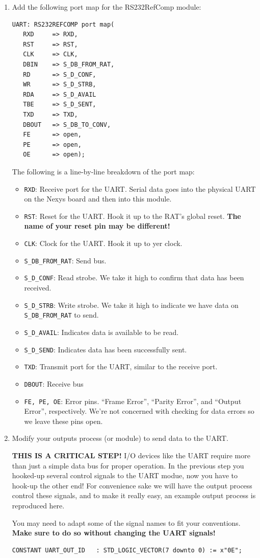 \documentclass[notitlepage]{article}
\newcommand{\warningsign}{\fontencoding{U}\fontfamily{futs}\Large\selectfont\char 66\relax}
\begin{document}
\begin {enumerate}
\item Add the following port map for the RS232RefComp module:
\begin{verbatim}
UART: RS232REFCOMP port map(
   RXD     => RXD,
   RST     => RST,
   CLK     => CLK,
   DBIN    => S_DB_FROM_RAT,
   RD      => S_D_CONF,
   WR      => S_D_STRB,
   RDA     => S_D_AVAIL
   TBE     => S_D_SENT,
   TXD     => TXD,
   DBOUT   => S_DB_TO_CONV,
   FE      => open,
   PE      => open,
   OE      => open);
\end{verbatim}
The following is a line-by-line breakdown of the port map:
\begin{itemize}
\item \texttt{RXD}: Receive port for the UART. Serial data goes into the physical UART on the Nexys board and then into this module.
\item \texttt{RST}: Reset for the UART. Hook it up to the RAT's global reset. \textbf{The name of your reset pin may be different!}
\item \texttt{CLK}: Clock for the UART. Hook it up to yer clock. 
\item \texttt{S\_DB\_FROM\_RAT}: Send bus.
\item \texttt{S\_D\_CONF}: Read strobe. We take it high to confirm that data has been received.
\item \texttt{S\_D\_STRB}: Write strobe. We take it high to indicate we have data on \texttt{S\_DB\_FROM\_RAT} to send.
\item \texttt{S\_D\_AVAIL}: Indicates data is available to be read.
\item \texttt{S\_D\_SEND}: Indicates data has been successfully sent.
\item \texttt{TXD}: Transmit port for the UART, similar to the receive port.
\item \texttt{DBOUT}: Receive bus
\item \texttt{FE, PE, OE}: Error pins. ``Frame Error'', ``Parity Error'', and ``Output Error'', respectively. We're not concerned with checking for data errors so we leave these pins open.
\end{itemize}

\item Modify your outputs process (or module) to send data to the UART.
\begin{infobox}
  {\warningsign} \textbf{THIS IS A CRITICAL STEP!} I/O devices like the UART require more than just a simple data bus for proper operation. In the previous step you hooked-up several control signals to the UART modue, now you have to hook-up the other end! For convenience sake we will have the output process control these signals, and to make it really easy, an example output process is reproduced here.
\end{infobox}
You may need to adapt some of the signal names to fit your conventions. \textbf{Make sure to do so without changing the UART signals!}
\begin{verbatim}
CONSTANT UART_OUT_ID   : STD_LOGIC_VECTOR(7 downto 0) := x"0E";


\end{verbatim}
\end{enumerate}
\end{document}
